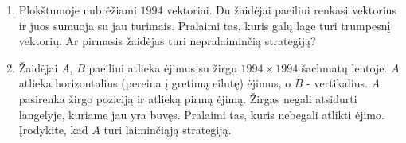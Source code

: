 \begin{enumerate}
\item Plokštumoje nubrėžiami $1994$ vektoriai. Du žaidėjai paeiliui renkasi
  vektorius ir juos sumuoja su jau turimais. Pralaimi tas, kuris galų lage
  turi trumpesnį vektorių. Ar pirmasis žaidėjas turi nepralaiminčią
  strategiją?


\item {} Žaidėjai $A$, $B$ paeiliui atlieka ėjimus su
  žirgu  $1994\times 1994$ šachmatų lentoje. $A$ atlieka horizontalius (pereina
  į gretimą eilutę) ėjimus, o $B$ - vertikalius. $A$ pasirenka žirgo poziciją
  ir atlieką pirmą ėjimą. Žirgas negali atsidurti langelyje, kuriame jau
  yra buvęs. Pralaimi tas, kuris nebegali atlikti ėjimo. Įrodykite, kad $A$
  turi laiminčiąją strategiją.

%


\end{enumerate}

